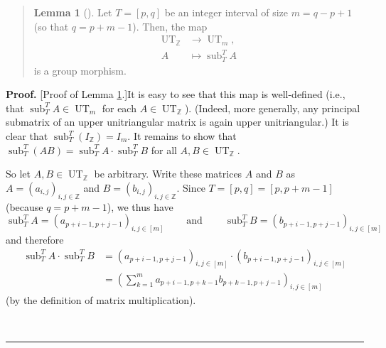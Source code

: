 \documentclass[numbers=enddot,12pt,final,onecolumn,notitlepage]{scrartcl}%
\newenvironment{statement}{\begin{quote}}{\end{quote}}
\theoremstyle{definition}
\newtheorem{lem}[theo]{Lemma}
\newenvironment{lemmain}[1][]
{\begin{statement}\begin{lem}[#1]}
{\end{lem}\end{statement}}
\newenvironment{proof}[1][Proof]{\noindent\textbf{#1.} }{\ \rule{0.5em}{0.5em}}
\newenvironment{lemmain}[1][Proof]{\noindent\textbf{#1.} }{\ \rule{0.5em}{0.5em}}
\let\sumnonlimits\sum
\renewcommand{\sum}{\sumnonlimits\limits}
\begin{document}
\begin{enumerate}
\begin{lemmain}
\label{lem.A1}Let $T=\left[  p,q\right]  $ be an integer interval of size
$m=q-p+1$ (so that $q=p+m-1$). Then, the map%
\begin{align}
\operatorname*{UT}\nolimits_{\mathbb{Z}}  &  \rightarrow\operatorname*{UT}%
\nolimits_{m},\nonumber\\
A  &  \mapsto\operatorname*{sub}\nolimits_{T}^{T}A \label{p17.lemA1.map}%
\end{align}
is a group morphism.
\end{lemmain}

\begin{proof}
[Proof of Lemma \ref{lem.A1}.]It is easy to see that this map is well-defined
(i.e., that $\operatorname*{sub}\nolimits_{T}^{T}A\in\operatorname*{UT}%
\nolimits_{m}$ for each $A\in\operatorname*{UT}\nolimits_{\mathbb{Z}}$).
(Indeed, more generally, any principal submatrix of an upper unitriangular
matrix is again upper unitriangular.) It is clear that $\operatorname*{sub}%
\nolimits_{T}^{T}\left(  I_{\mathbb{Z}}\right)  =I_{m}$. It remains to show
that $\operatorname*{sub}\nolimits_{T}^{T}\left(  AB\right)
=\operatorname*{sub}\nolimits_{T}^{T}A\cdot\operatorname*{sub}\nolimits_{T}%
^{T}B$ for all $A,B\in\operatorname*{UT}\nolimits_{\mathbb{Z}}$.

So let $A,B\in\operatorname*{UT}\nolimits_{\mathbb{Z}}$ be arbitrary. Write
these matrices $A$ and $B$ as $A=\left(  a_{i,j}\right)  _{i,j\in\mathbb{Z}}$
and $B=\left(  b_{i,j}\right)  _{i,j\in\mathbb{Z}}$. Since $T=\left[
p,q\right]  =\left[  p,p+m-1\right]  $ (because $q=p+m-1$), we thus have%
\[
\operatorname*{sub}\nolimits_{T}^{T}A=\left(  a_{p+i-1,p+j-1}\right)
_{i,j\in\left[  m\right]  }\ \ \ \ \ \ \ \ \ \ \text{and}%
\ \ \ \ \ \ \ \ \ \ \operatorname*{sub}\nolimits_{T}^{T}B=\left(
b_{p+i-1,p+j-1}\right)  _{i,j\in\left[  m\right]  }%
\]
and therefore%
\begin{align}
\operatorname*{sub}\nolimits_{T}^{T}A\cdot\operatorname*{sub}\nolimits_{T}%
^{T}B  &  =\left(  a_{p+i-1,p+j-1}\right)  _{i,j\in\left[  m\right]  }%
\cdot\left(  b_{p+i-1,p+j-1}\right)  _{i,j\in\left[  m\right]  }\nonumber\\
&  =\left(  \sum_{k=1}^{m}a_{p+i-1,p+k-1}b_{p+k-1,p+j-1}\right)
_{i,j\in\left[  m\right]  } \label{p17.lemA1.pf.0}%
\end{align}
(by the definition of matrix multiplication).


\end{proof}
\end{enumerate}
\end{document}
